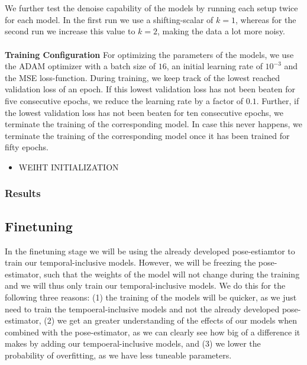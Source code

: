 \documentclass[./main.tex]{subfiles}
\begin{document}
\\
\\
We further test the denoise capability of the models by running each setup twice for each model. In the first run we use a shifting-scalar of $k = 1$, whereas for the second run we increase this value to $k = 2$, making the data a lot more noisy.
\\
\\
\textbf{Training Configuration} For optimizing the parameters of the models, we use the ADAM optimizer with a batch size of $16$, an initial learning rate of $10^{-3}$ and the MSE loss-function. During training, we keep track of the lowest reached validation loss of an epoch. If this lowest validation loss has not been beaten for five consecutive epochs, we reduce the learning rate by a factor of $0.1$. Further, if the lowest validation loss has not been beaten for ten consecutive epochs, we terminate the training of the corresponding model. In case this never happens, we terminate the training of the corresponding model once it has been trained for fifty epochs.

\begin{itemize}
    \item WEIHT INITIALIZATION
\end{itemize}

\subsubsection{Results}

\subsection{Finetuning}
In the finetuning stage we will be using the already developed pose-estiamtor to train our temporal-inclusive models. However, we will be freezing the pose-estimator, such that the weights of the model will not change during the training and we will thus only train our temporal-inclusive models. We do this for the following three reasons: (1) the training of the models will be quicker, as we just need to train the tempoeral-inclusive models and not the already developed pose-estimator, (2) we get an greater understanding of the effects of our models when combined with the pose-estimator, as we can clearly see how big of a difference it makes by adding our tempoeral-inclusive models, and (3) we lower the probability of overfitting, as we have less tuneable parameters.
\end{document}
